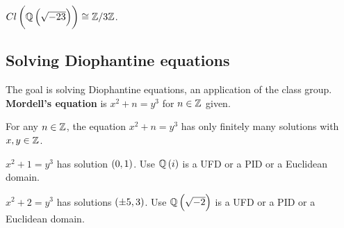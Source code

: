 \begin{example*}
$ Cl\br{\Q\br{\sqrt{-23}}} \cong \Z / 3\Z $.
\end{example*}

\pagebreak

\subsection{Solving Diophantine equations}


The goal is solving Diophantine equations, an application of the class group. \textbf{Mordell's equation} is $ x^2 + n = y^3 $ for $ n \in \mathbb{Z} $ given.

\begin{theorem}
For any $ n \in \mathbb{Z} $, the equation $ x^2 + n = y^3 $ has only finitely many solutions with $ x, y \in \mathbb{Z} $.
\end{theorem}

\begin{example*}
$ x^2 + 1 = y^3 $ has solution $ \br{0, 1} $. Use $ \Q\br{i} $ is a UFD or a PID or a Euclidean domain.
\end{example*}

\begin{example*}
$ x^2 + 2 = y^3 $ has solutions $ \br{\pm 5, 3} $. Use $ \Q\br{\sqrt{-2}} $ is a UFD or a PID or a Euclidean domain.
\end{example*}

